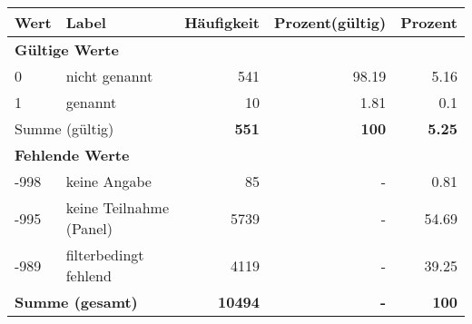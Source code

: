      \begin{longtable}{lXrrr}
     \toprule
     \textbf{Wert} & \textbf{Label} & \textbf{Häufigkeit} & \textbf{Prozent(gültig)} & \textbf{Prozent} \\
     \endhead
     \midrule
     \multicolumn{5}{l}{\textbf{Gültige Werte}}\\

     0 &
     \multicolumn{1}{X}{ nicht genannt   } &


       \num{541} &
       \num[round-mode=places,round-precision=2]{98,19} &
         \num[round-mode=places,round-precision=2]{5,16} \\

     1 &
     \multicolumn{1}{X}{ genannt   } &


       \num{10} &
       \num[round-mode=places,round-precision=2]{1,81} &
         \num[round-mode=places,round-precision=2]{0,1} \\
     \midrule
     \multicolumn{2}{l}{Summe (gültig)} &
       \textbf{\num{551}} &
     \textbf{100} &
       \textbf{\num[round-mode=places,round-precision=2]{5,25}} \\
     \multicolumn{5}{l}{\textbf{Fehlende Werte}}\\
       -998 &
       keine Angabe &
         \num{85} &
        - &
         \num[round-mode=places,round-precision=2]{0,81} \\
       -995 &
       keine Teilnahme (Panel) &
         \num{5739} &
        - &
         \num[round-mode=places,round-precision=2]{54,69} \\
       -989 &
       filterbedingt fehlend &
         \num{4119} &
        - &
         \num[round-mode=places,round-precision=2]{39,25} \\
     \midrule
     \multicolumn{2}{l}{\textbf{Summe (gesamt)}} &
          \textbf{\num{10494}} &
        \textbf{-} &
        \textbf{100} \\
     \bottomrule
     \end{longtable}
     
